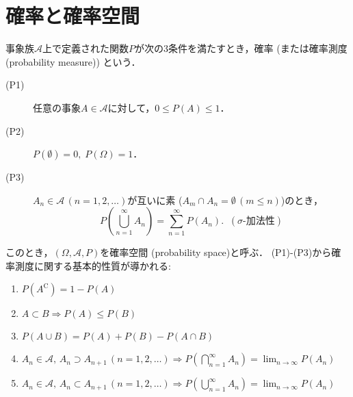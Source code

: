 \documentclass{jsreport}
\begin{document}
\section{確率と確率空間}
\begin{screen}
  \begin{defi}\label{def:pr_measure}
    事象族$\mathscr{A}$上で定義された関数$P$が次の3条件を満たすとき，確率 (または確率測度 (probability measure)) という．
    \begin{description}
      \item[(P1)] 任意の事象$A \in \mathscr{A}$に対して，$0 \leq P(A) \leq 1$．\label{des:p1}
      \item[(P2)] $P(\emptyset) = 0, \; P(\Omega) = 1$．\label{des:p2}
      \item[(P3)] $A_n \in \mathscr{A} \, (n = 1, 2, \ldots)$が互いに素 ($A_m \cap A_n = \emptyset \, (m \leq n)$)のとき，\label{des:p3}
      \begin{equation}
        P\left(\bigcup_{n = 1}^{\infty} A_n\right) = \sum_{n = 1}^{\infty} P(A_n). \; \; (\sigma\mbox{-}加法性)\nonumber
      \end{equation}
    \end{description}
  \end{defi}
\end{screen}
このとき，$(\Omega, \mathscr{A}, P)$を確率空間 (probability space)と呼ぶ．
(P1)-(P3)から確率測度に関する基本的性質が導かれる:
\begin{enumerate}
  \item $P(A^{\mathrm{C}}) = 1 - P(A)$ \label{enu:p_1}
  \item $A \subset B \Longrightarrow P(A) \leq P(B)$ \label{enu:p_2}
  \item $P(A \cup B) = P(A) + P(B) - P(A \cap B)$ \label{enu:p_3}
  \item $A_n \in \mathscr{A}, \, A_n \supset A_{n + 1} \, (n = 1, 2, \ldots) \Longrightarrow P(\bigcap_{n = 1}^{\infty} A_n) = \lim_{n \to \infty} P(A_n)$ \label{enu:p_4}
  \item $A_n \in \mathscr{A}, \, A_n \subset A_{n + 1} \, (n = 1, 2, \ldots) \Longrightarrow P(\bigcup_{n = 1}^{\infty} A_n) = \lim_{n \to \infty} P(A_n)$ \label{enu:p_5}
\end{enumerate}
\end{document}
